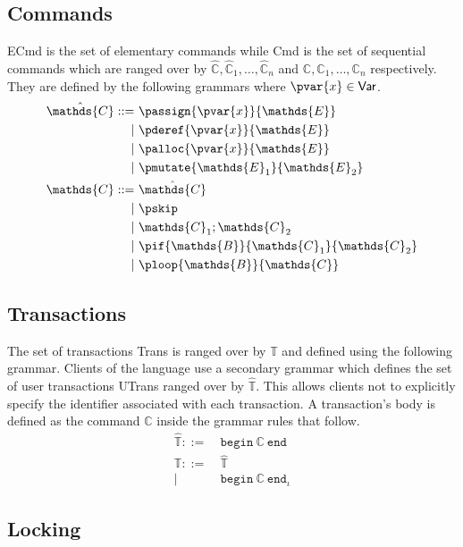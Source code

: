 \subsection{Commands}

\textsf{ECmd} is the set of elementary commands while \textsf{Cmd} is the set of sequential commands which are ranged over by $\hat{\mathds{C}}, \hat{\mathds{C}}_1, \ldots, \hat{\mathds{C}}_n$ and $\mathds{C}, \mathds{C}_1, \ldots, \mathds{C}_n$ respectively. They are defined by the following grammars where $\pvar{x} \in \mathsf{Var}$.
\begin{align*}
\hat{\mathds{C}} ::=&
\ \passign{\pvar{x}}{\mathds{E}} \\
|&\ \pderef{\pvar{x}}{\mathds{E}} \\
|&\ \palloc{\pvar{x}}{\mathds{E}} \\
|&\ \pmutate{\mathds{E}_1}{\mathds{E}_2} \\
\mathds{C} ::=&
\ \hat{\mathds{C}} \\
|&\ \pskip \\
|&\ \mathds{C}_1; \mathds{C}_2 \\
|&\ \pif{\mathds{B}}{\mathds{C}_1}{\mathds{C}_2} \\
|&\ \ploop{\mathds{B}}{\mathds{C}}
\end{align*}

\subsection{Transactions}

The set of transactions \textsf{Trans} is ranged over by $\mathds{T}$ and defined using the following grammar. Clients of the language use a secondary grammar which defines the set of user transactions \textsf{UTrans} ranged over by $\hat{\mathds{T}}$. This allows clients not to explicitly specify the identifier associated with each transaction. A transaction's body is defined as the command $\mathds{C}$ inside the grammar rules that follow.
\begin{align*}
\hat{\mathds{T}} ::=&
\ \mathtt{begin}\ \mathds{C}\ \mathtt{end} \\
\mathds{T} ::=&
\ \hat{\mathds{T}} \\
|&\ \mathtt{begin}\ \mathds{C}\ \mathtt{end}_\iota
\end{align*}

\subsection{Locking}

